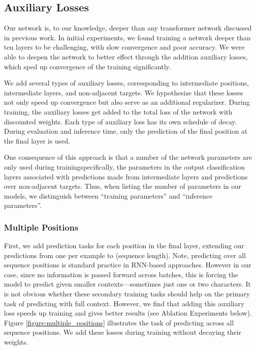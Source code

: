 \documentclass[letterpaper]{article}
\begin{document}
\subsection{Auxiliary Losses}
\label{section:aux}
Our network is, to our knowledge, deeper than any transformer network discussed in previous work.
In initial experiments, we found training a network deeper than ten layers to be challenging, with slow convergence and poor accuracy.
We were able to deepen the network to better effect through the addition auxiliary losses, which sped up convergence of the training significantly.

We add several types of auxiliary losses, corresponding to intermediate positions, intermediate layers, and non-adjacent targets.
We hypothesize that these losses not only speed up convergence but also serve as an additional regularizer.
During training, the auxiliary losses get added to the total loss of the network with discounted weights.
Each type of auxiliary loss has its own schedule of decay.
During evaluation and inference time, only the prediction of the final position at the final layer is used.

One consequence of this approach is that a number of the network parameters are only used during training\textemdash specifically, the parameters in the output classification layers associated with predictions made from intermediate layers and predictions over non-adjacent targets.
Thus, when listing the number of parameters in our models, we distinguish between ``training parameters'' and ``inference parameters''.


\subsubsection{Multiple Positions}

First, we add prediction tasks for each position in the final layer, extending our predictions from one per example to  (sequence length).
Note, predicting over all sequence positions is standard practice in RNN-based approaches.
However in our case, since no information is passed forward across batches, this is forcing the model to predict given smaller contexts---sometimes just one or two characters.
It is not obvious whether these secondary training tasks should help on the primary task of predicting with full context.
However, we find that adding this auxiliary loss speeds up training and gives better results (see Ablation Experiments below).
Figure \ref{figure:multiple_positions} illustrates the task of predicting across all sequence positions.
We add these losses during training without decaying their weights.
\end{document}
